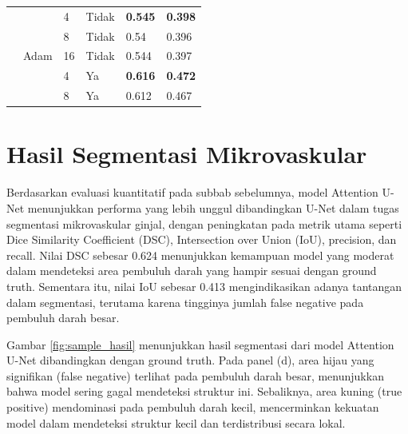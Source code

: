 \begin{table}[H]
\begin{tabular}{llllll}
		& \multirow{5}{*}{Adam} & 4          & Tidak      & \textbf{0.545} & \textbf{0.398} \\
		&                       & 8          & Tidak      & 0.54           & 0.396          \\
		&                       & 16         & Tidak      & 0.544          & 0.397          \\ \cline{3-6} 
		&                       & 4          & Ya         & \textbf{0.616} & \textbf{0.472} \\
		&                       & 8          & Ya         & 0.612          & 0.467          \\ \hline
	\end{tabular}
\end{table}

\section{Hasil Segmentasi Mikrovaskular}

\noindent Berdasarkan evaluasi kuantitatif pada subbab sebelumnya, model Attention U-Net menunjukkan performa yang lebih unggul dibandingkan U-Net dalam tugas segmentasi mikrovaskular ginjal, dengan peningkatan pada metrik utama seperti Dice Similarity Coefficient (DSC), Intersection over Union (IoU), precision, dan recall. Nilai DSC sebesar 0.624 menunjukkan kemampuan model yang moderat dalam mendeteksi area pembuluh darah yang hampir sesuai dengan ground truth. Sementara itu, nilai IoU sebesar 0.413 mengindikasikan adanya tantangan dalam segmentasi, terutama karena tingginya jumlah false negative pada pembuluh darah besar.


\noindent Gambar \ref{fig:sample_hasil} menunjukkan hasil segmentasi dari model Attention U-Net dibandingkan dengan ground truth. Pada panel (d), area hijau yang signifikan (false negative) terlihat pada pembuluh darah besar, menunjukkan bahwa model sering gagal mendeteksi struktur ini. Sebaliknya, area kuning (true positive) mendominasi pada pembuluh darah kecil, mencerminkan kekuatan model dalam mendeteksi struktur kecil dan terdistribusi secara lokal.

